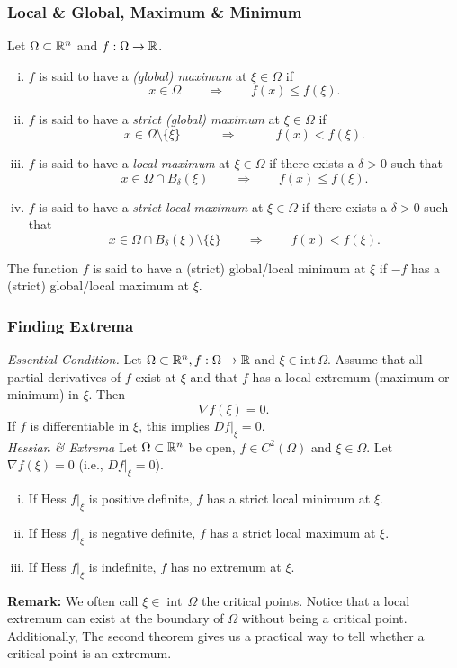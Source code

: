 \documentclass[10pt, t, allowdisplaybreaks]{beamer}
\renewcommand{\emph}[1]{{\color{Turquoise3}\textsl{#1}}}
\newcommand{\nullspace}{~\\[15pt]}
\begin{document}
\begin{frame}
    \frametitle{Local \& Global, Maximum \& Minimum}
    Let $\Omega\subset\mathbb{R}^n$ and $f:\Omega\to\mathbb{R}$.

    \begin{enumerate}[(i)]
        \item $f$ is said to have a \emph{(global) maximum} at $\xi\in\Omega$ if
              \[x\in\Omega\qquad\Rightarrow\qquad
                  f(x)\leq f(\xi).\]
        \item $f$ is said to have a \emph{strict (global) maximum} at $\xi\in\Omega$ if
              \[x\in\Omega\setminus\{\xi\}\qquad\quad
                  \Rightarrow\qquad\quad f(x)<f(\xi).\]
        \item $f$ is said to have a \emph{local maximum} at $\xi\in\Omega$ if there exists a $\delta>0$ such that
              \[x\in\Omega\cap B_\delta(\xi)\qquad\Rightarrow\qquad
                  f(x)\leq f(\xi).\]
        \item $f$ is said to have a \emph{strict local maximum} at $\xi\in\Omega$ if there exists a $\delta>0$ such that
              \[x\in\Omega\cap B_\delta(\xi)\setminus\{\xi\}\qquad
                  \Rightarrow\qquad f(x)<f(\xi).\]
    \end{enumerate}
    The function $f$ is said to have a (strict) global/local minimum at $\xi$ if $-f$ has a (strict) global/local maximum at $\xi$.
\end{frame}

\begin{frame}
    \frametitle{Finding Extrema}
    \emph{Essential Condition.} Let $\Omega\subset\mathbb{R}^n,f:\Omega\to\mathbb{R}$ and $\xi\in\text{int}\,\Omega$. Assume that all partial derivatives of $f$ exist at $\xi$ and that $f$ has a local extremum (maximum or minimum) in $\xi$. Then
    \[\nabla f(\xi)=0.\]
    If $f$ is dif{}ferentiable in $\xi$, this implies $Df|_\xi=0$.
    \nullspace
    \emph{Hessian \& Extrema} Let $\Omega\subset\mathbb{R}^n$ be open, $f\in C^2(\Omega)$ and $\xi\in\Omega$. Let $\nabla f(\xi)=0$ (i.e., $Df|_\xi=0$).
    \begin{enumerate}[(i)]
        \item If Hess $f|_\xi$ is positive definite, $f$ has a strict local minimum at $\xi$.
        \item If Hess $f|_\xi$ is negative definite, $f$ has a strict local maximum at $\xi$.
        \item If Hess $f|_\xi$ is indefinite, $f$ has no extremum at $\xi$.
    \end{enumerate}
    \vspace{8pt}
    \textbf{Remark:} We often call $\xi\in\operatorname{int}\,\Omega$ the critical points. Notice that a local extremum can exist at the boundary of $\Omega$ without being a critical point. Additionally, The second theorem gives us a practical way to tell whether a critical point is an extremum.
\end{frame}
\end{document}
